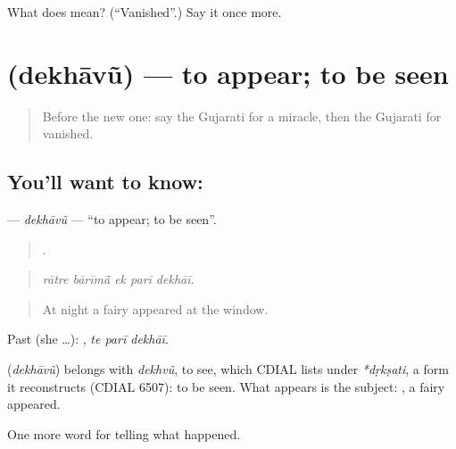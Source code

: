 \begin{tcolorbox}[breakable,colback=teal!4,colframe=teal!35!black,title={Before you move on}]
What does  mean? (\textquotedblleft{}Vanished\textquotedblright{}.) Say it once more.
\end{tcolorbox}
\section[\texorpdfstring{\gu{દેખાવું} (dekhāvũ)}{દેખાવું (dekhāvũ)}]{ (dekhāvũ) — to appear; to be seen}

\label{lesson:GU-C333-dekhavu}



\begin{quote}
Before the new one: say the Gujarati for a miracle, then the Gujarati for vanished.
\end{quote}

\subsection*{You'll want to know: }
\textbf{} — \emph{dekhāvũ} — \textquotedblleft{}to appear; to be seen\textquotedblright{}.

\begin{quote}
    .
\end{quote}

\begin{quote}
\emph{rātre bārīmā̃ ek parī dekhāī.}
\end{quote}

\begin{quote}
At night a fairy appeared at the window.
\end{quote}

Past (she …):   , \emph{te parī dekhāī}.

\begin{cousinweb}
\textbf{} (\emph{dekhāvũ}) belongs with \emph{dekhvũ}, to see, which CDIAL lists under \emph{*dṛkṣati}, a form it reconstructs (CDIAL 6507): to be seen. What appears is the subject: \textbf{ }, a fairy appeared.
\end{cousinweb}

\begin{grammarlens}[title={What you've built}]
One more word for telling what happened.
\end{grammarlens}

